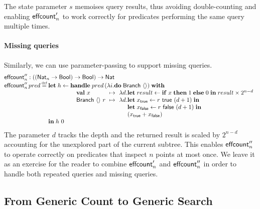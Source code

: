 \documentclass[12pt,phd,lfcs,twoside,openright,logo,leftchapter,normalheadings]{infthesis}
\theoremstyle{plain}
\theoremstyle{definition}
\begin{document}
%
The state parameter $s$ memoises query results, thus avoiding
double-counting and enabling $\mathsf{effcount}'_n$ to work correctly for
predicates performing the same query multiple times.

\paragraph{Missing queries}
%
Similarly, we can use parameter-passing to support missing queries.
%
{\small
\[
  \bl
    \ECount''_n : ((\Nat_n \to \Bool) \to \Bool) \to \Nat\\
    \ECount''_n\,pred \defas
      \bl
      \Let\;h \revto \bl
                     \Handle\;pred\,(\lambda i. \Do\;\Branch~\Unit)\;\With\\
                     \quad
                       \ba[t]{@{}l@{\hspace{1.5ex}}c@{\hspace{1.5ex}}l@{}}
                         \Val~x &\mapsto& \lambda d.
                           \ba[t]{@{}l}
                             \Let\; result \revto \If\;x\;\Then\;1\;\Else\;0\;\In\;
                             result \times 2^{n - d}\\
                           \ea\\
                         \Branch~\Unit~r &\mapsto& \lambda d.
                           \ba[t]{@{}l}
                             \Let\;x_\True \revto r~\True~(d+1)\;\In\\
                             \Let\;x_\False \revto r~\False~(d+1)\;\In\\
                             (x_\True + x_\False)
                           \ea
                       \ea\\
                     \el \\
      \In\;h~0 \\
      \el \\
  \el
\]}%
%
The parameter $d$ tracks the depth and the returned result is scaled
by $2^{n-d}$ accounting for the unexplored part of the current
subtree.
%
This enables $\mathsf{effcount}''_n$ to operate correctly on predicates that
inspect $n$ points at most once.
%
We leave it as an exercise for the reader to combine $\mathsf{effcount}'_n$ and
$\mathsf{effcount}''_n$ in order to handle both repeated queries and missing
queries.

\subsection{From Generic Count to Generic Search}
\label{sec:count-vs-search}
\end{document}

